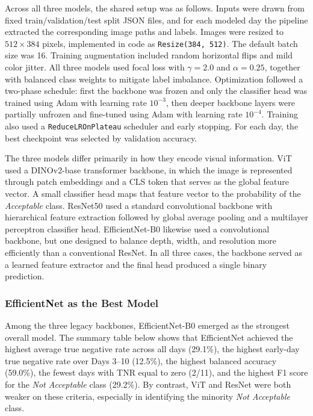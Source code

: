 \documentclass{article}
\begin{document}
Across all three models, the shared setup was as follows. Inputs were drawn from fixed train/validation/test split JSON files, and for each modeled day the pipeline extracted the corresponding image paths and labels. Images were resized to $512 \times 384$ pixels, implemented in code as \texttt{Resize(384, 512)}. The default batch size was 16. Training augmentation included random horizontal flips and mild color jitter. All three models used focal loss with $\gamma = 2.0$ and $\alpha = 0.25$, together with balanced class weights to mitigate label imbalance. Optimization followed a two-phase schedule: first the backbone was frozen and only the classifier head was trained using Adam with learning rate $10^{-3}$, then deeper backbone layers were partially unfrozen and fine-tuned using Adam with learning rate $10^{-4}$. Training also used a \texttt{ReduceLROnPlateau} scheduler and early stopping. For each day, the best checkpoint was selected by validation accuracy.

The three models differ primarily in how they encode visual information. ViT used a DINOv2-base transformer backbone, in which the image is represented through patch embeddings and a CLS token that serves as the global feature vector. A small classifier head maps that feature vector to the probability of the \textit{Acceptable} class. ResNet50 used a standard convolutional backbone with hierarchical feature extraction followed by global average pooling and a multilayer perceptron classifier head. EfficientNet-B0 likewise used a convolutional backbone, but one designed to balance depth, width, and resolution more efficiently than a conventional ResNet. In all three cases, the backbone served as a learned feature extractor and the final head produced a single binary prediction.

\subsubsection{EfficientNet as the Best Model}

Among the three legacy backbones, EfficientNet-B0 emerged as the strongest overall model. The summary table below shows that EfficientNet achieved the highest average true negative rate across all days (29.1\%), the highest early-day true negative rate over Days 3--10 (12.5\%), the highest balanced accuracy (59.0\%), the fewest days with TNR equal to zero (2/11), and the highest F1 score for the \textit{Not Acceptable} class (29.2\%). By contrast, ViT and ResNet were both weaker on these criteria, especially in identifying the minority \textit{Not Acceptable} class.
\end{document}

